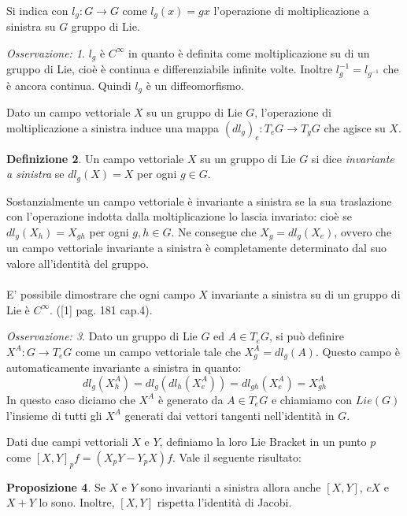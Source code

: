 \documentclass[12pt,a4paper]{report}
\theoremstyle{definition}
\newtheorem{Def}{Definizione}[chapter]
\newtheorem{Prop}[Def]{Proposizione}
\theoremstyle{definition}
\theoremstyle{definition}
\theoremstyle{remark}
\newtheorem{Obs}[Def]{Osservazione:}
\begin{document}
\\
Si indica con $l_g:G\rightarrow G$ come $l_g(x)=gx$ l'operazione di moltiplicazione a sinistra su $G$ gruppo di Lie.\\
\begin{Obs}
	$l_g$ è $C^\infty$ in quanto è definita come moltiplicazione su di un gruppo di Lie, cioè è continua e differenziabile infinite volte. Inoltre $l_g^{-1}=l_{g^{-1}}$ che è ancora continua. Quindi $l_g$ è un diffeomorfismo.
\end{Obs}
Dato un campo vettoriale $X$ su un gruppo di Lie $G$, l'operazione di moltiplicazione a sinistra induce una mappa $(dl_g)_e:T_eG\rightarrow T_gG$ che agisce su $X$.\\
\begin{Def}
	Un campo vettoriale $X$ su un gruppo di Lie $G$ si dice \textit{invariante a sinistra} se $dl_g(X)=X$ per ogni $g\in G$.
\end{Def}
Sostanzialmente un campo vettoriale è invariante a sinistra se la sua traslazione con l'operazione indotta dalla moltiplicazione lo lascia invariato: cioè se $dl_g(X_h)=X_{gh}$ per ogni $g,h\in G$.
Ne consegue che $X_g=dl_g(X_e)$, ovvero che un campo vettoriale invariante a sinistra è completamente determinato dal suo valore all'identità del gruppo.\\
\\
E' possibile dimostrare che ogni campo $X$ invariante a sinistra su di un gruppo di Lie è $C^\infty$. ([1] pag. 181 cap.4).\\
\begin{Obs}
	Dato un gruppo di Lie $G$ ed $A\in T_eG$, si può definire \\$X^A:G\rightarrow T_eG$ come un campo vettoriale tale che $X^A_g=dl_g(A)$. Questo campo è automaticamente invariante a sinistra in quanto: $$dl_g(X^A_h)=dl_g(dl_h(X^A_e))=dl_{gh}(X^A_e)=X^A_{gh}$$
	In questo caso diciamo che $X^A$ è generato da $A\in T_eG$ e chiamiamo con $Lie(G)$ l'insieme di tutti gli $X^A$ generati dai vettori tangenti nell'identità in $G$.	
\end{Obs}
Dati due campi vettoriali $X$ e $Y$, definiamo la loro Lie Bracket in un punto $p$ come $[X,Y]_pf=(X_pY-Y_pX)f$.
Vale il seguente risultato:
\begin{Prop}
	Se $X$ e $Y$ sono invarianti a sinistra allora anche $[X,Y]$, $cX$ e $X+Y$ lo sono. Inoltre, $[X,Y]$ rispetta l'identità di Jacobi.
\end{Prop}
\end{document}
